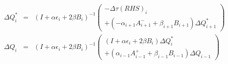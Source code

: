 \begin{eqnarray}
\Delta Q^*_i 
&=&
\left(
I 
+ \alpha \epsilon_i
+ 2 \beta B_i 
\right)^{-1}
\left(
\begin{array}{c}
-\Delta \tau \left(RHS \right)_i
\\
+\left(
-\alpha_{i+1} A^-_{i+1} 
+\beta_{i+1} B_{i+1} \right)
\Delta Q^*_{i+1}
\end{array}
\right)
\nonumber
\\
\Delta Q_i 
&=&
\left(
I 
+ \alpha \epsilon_i
+ 2 \beta B_i 
\right)^{-1}
\left(
\begin{array}{c}
\left(
I 
+ \alpha \epsilon_i
+ 2 \beta B_i 
\right)
\Delta Q^*_{i}
\\
+\left(\alpha_{i-1} A^+_{i-1} 
+\beta_{i-1} B_{i-1} \right)
\Delta Q_{i-1}
\end{array}
\right)
\nonumber
\end{eqnarray}

